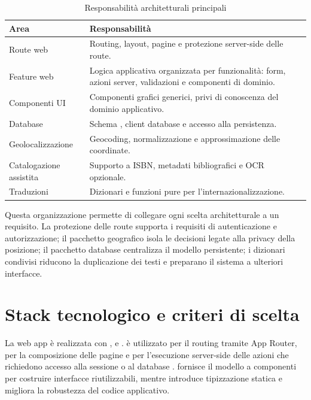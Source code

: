 \begin{table}[H]
    \centering
    \caption{Responsabilità architetturali principali}
    \label{tab:responsabilita-architetturali}
    \small
    \begin{tabularx}{\textwidth}{p{}X}
        \toprule
        \textbf{Area} & \textbf{Responsabilità} \\
        \midrule
        Route web & Routing, layout, pagine e protezione server-side delle route. \\
        Feature web & Logica applicativa organizzata per funzionalità: form, azioni server, validazioni e componenti di dominio. \\
        Componenti UI & Componenti grafici generici, privi di conoscenza del dominio applicativo. \\
        Database & Schema \prisma{}, client database e accesso alla persistenza. \\
        Geolocalizzazione & Geocoding, normalizzazione e approssimazione delle coordinate. \\
        Catalogazione assistita & Supporto a ISBN, metadati bibliografici e OCR opzionale. \\
        Traduzioni & Dizionari e funzioni pure per l'internazionalizzazione. \\
        \bottomrule
    \end{tabularx}
\end{table}

Questa organizzazione permette di collegare ogni scelta architetturale a un requisito. La protezione delle route supporta i requisiti di autenticazione e autorizzazione; il pacchetto geografico isola le decisioni legate alla privacy della posizione; il pacchetto database centralizza il modello persistente; i dizionari condivisi riducono la duplicazione dei testi e preparano il sistema a ulteriori interfacce.

\section{Stack tecnologico e criteri di scelta}
\label{sec:stack-tecnologico}

La web app è realizzata con \nextjs{}, \reactjs{} e \typescript{}. \nextjs{} è utilizzato per il routing tramite App Router, per la composizione delle pagine e per l'esecuzione server-side delle azioni che richiedono accesso alla sessione o al database \cite{nextjs}. \reactjs{} fornisce il modello a componenti per costruire interfacce riutilizzabili, mentre \typescript{} introduce tipizzazione statica e migliora la robustezza del codice applicativo.

